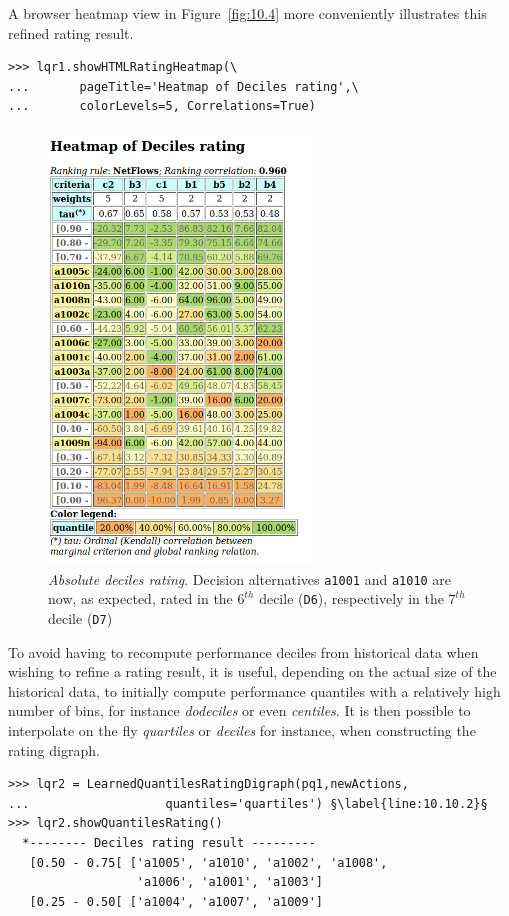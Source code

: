 A browser heatmap view in Figure~\vref{fig:10.4} more conveniently illustrates this refined rating result.
\begin{lstlisting}
>>> lqr1.showHTMLRatingHeatmap(\
...       pageTitle='Heatmap of Deciles rating',\
...       colorLevels=5, Correlations=True)
\end{lstlisting}
\begin{figure}[ht]
\sidecaption[t]
\includegraphics[width=7cm]{Figures/10-4-heatMap2.png}
\caption[Heatmap of absolute deciles rating]{\emph{Absolute deciles rating}. Decision alternatives \texttt{a1001} and \texttt{a1010} are now, as expected, rated in the $6^{th}$ decile (\texttt{D6}), respectively in the $7^{th}$ decile (\texttt{D7})}
\label{fig:10.4}       %
\end{figure}

To avoid having to recompute performance deciles from historical data when wishing to refine a rating result, it is useful, depending on the actual size of the historical data, to initially compute performance quantiles with a relatively high number of bins, for instance \emph{dodeciles} or even \emph{centiles}. It is then possible to interpolate on the fly \emph{quartiles} or \emph{deciles} for instance, when constructing the rating digraph. 
\begin{lstlisting}[caption={From deciles interpolated quartiles rating result},label=list:10.10]
>>> lqr2 = LearnedQuantilesRatingDigraph(pq1,newActions,
...                   quantiles='quartiles') §\label{line:10.10.2}§
>>> lqr2.showQuantilesRating()
  *-------- Deciles rating result ---------
   [0.50 - 0.75[ ['a1005', 'a1010', 'a1002', 'a1008',
                  'a1006', 'a1001', 'a1003']
   [0.25 - 0.50[ ['a1004', 'a1007', 'a1009']
\end{lstlisting}

